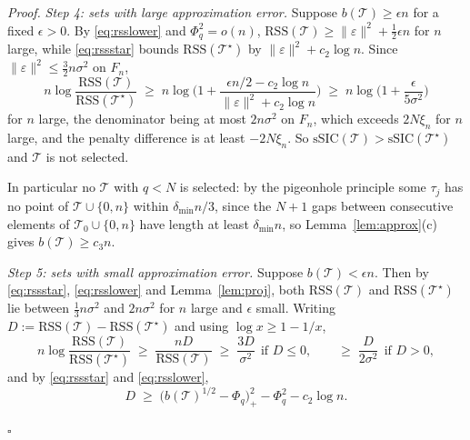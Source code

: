 \documentclass[12pt, a4paper]{article}
\newcommand{\qed}{\hfill$\square$}
\newenvironment{proof}[1][Proof]{\par\noindent\textit{#1.}\space}{\qed\par\medskip}
\begin{document}
\begin{proof}
\medskip
\noindent\emph{Step 4: sets with large approximation error.} Suppose
$b(\mathcal{T}) \ge \epsilon n$ for a fixed $\epsilon > 0$. By
\eqref{eq:rsslower} and $\Phi_q^2 = o(n)$,
$\mathrm{RSS}(\mathcal{T}) \ge \|\varepsilon\|^2 + \tfrac12\epsilon n$ for $n$
large, while \eqref{eq:rssstar} bounds
$\mathrm{RSS}(\mathcal{T}^\star)$ by $\|\varepsilon\|^2 + c_2\log n$. Since
$\|\varepsilon\|^2 \le \tfrac32 n\sigma^2$ on $F_n$,
\[ n \log \frac{\mathrm{RSS}(\mathcal{T})}{\mathrm{RSS}(\mathcal{T}^\star)} \;\ge\; n \log\Big( 1 + \frac{\epsilon n/2 - c_2\log n}{\|\varepsilon\|^2 + c_2\log n} \Big) \;\ge\; n \log\Big(1 + \frac{\epsilon}{5\sigma^2}\Big) \]
for $n$ large, the denominator being at most $2n\sigma^2$ on $F_n$,
which exceeds $2N\xi_n$ for $n$ large, and the penalty difference is at least
$-2N\xi_n$. So $\mathrm{sSIC}(\mathcal{T}) > \mathrm{sSIC}(\mathcal{T}^\star)$
and $\mathcal{T}$ is not selected.

In particular no $\mathcal{T}$ with $q < N$ is selected: by the pigeonhole
principle some $\tau_j$ has no point of $\mathcal{T}\cup\{0,n\}$ within
$\delta_{\min}n/3$, since the $N+1$ gaps between consecutive elements of
$\mathcal{T}_0 \cup \{0,n\}$ have length at least $\delta_{\min}n$, so
Lemma~\ref{lem:approx}(c) gives $b(\mathcal{T}) \ge c_3 n$.

\medskip
\noindent\emph{Step 5: sets with small approximation error.} Suppose
$b(\mathcal{T}) < \epsilon n$. Then by \eqref{eq:rssstar},
\eqref{eq:rsslower} and Lemma~\ref{lem:proj}, both
$\mathrm{RSS}(\mathcal{T})$ and $\mathrm{RSS}(\mathcal{T}^\star)$ lie between
$\tfrac13 n\sigma^2$ and $2n\sigma^2$ for $n$ large and $\epsilon$ small.
Writing $D := \mathrm{RSS}(\mathcal{T}) - \mathrm{RSS}(\mathcal{T}^\star)$ and
using $\log x \ge 1 - 1/x$,
\[
n \log \frac{\mathrm{RSS}(\mathcal{T})}{\mathrm{RSS}(\mathcal{T}^\star)}
\;\ge\; \frac{n D}{\mathrm{RSS}(\mathcal{T})}
\;\ge\; \frac{3D}{\sigma^2} \ \ \text{if } D \le 0, \qquad \ge\; \frac{D}{2\sigma^2} \ \ \text{if } D > 0 ,
\]
and by \eqref{eq:rssstar} and \eqref{eq:rsslower},
\begin{equation}
\label{eq:Dbound}
D \;\ge\; \big( b(\mathcal{T})^{1/2} - \Phi_q \big)_+^2 - \Phi_q^2
- c_2 \log n .
\end{equation}


\end{proof}
\end{document}
